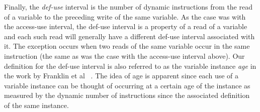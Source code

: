\documentclass[10pt,dvips]{article}
\begin{document}
Finally, the \textit{def-use} interval is the number of
dynamic
instructions from the read of a variable to the preceding write
of the same variable.
As the case was with the access-use interval,
the def-use interval is a property of a read of a variable
and each such read will generally have a 
different def-use interval associated with it.
The exception occurs when two reads of the same variable occur in 
the same instruction (the
same as was the case with the access-use interval above).
Our definition for the def-use interval is also referred to
as the variable instance \textit{age} in the work by 
Franklin et al ~\cite{Franklin92}.
The idea of age is apparent since each use of a variable instance
can be thought of occurring at a certain age of the instance as
measured by the dynamic number of instructions since the associated
definition of the same instance.
\end{document}
